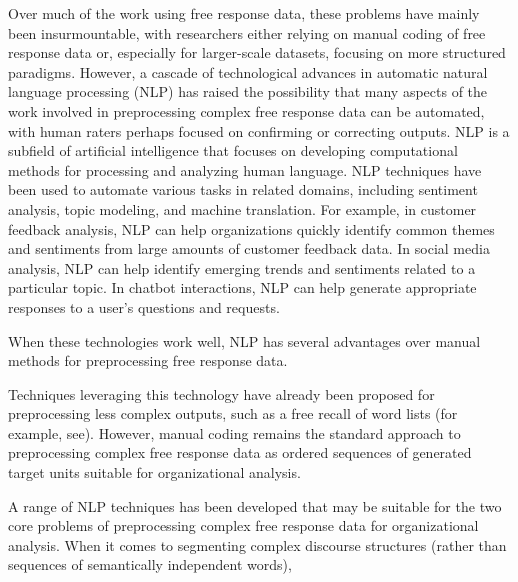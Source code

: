 \documentclass[
  letterpaper,
  DIV=11,
  numbers=noendperiod]{scrreprt}
\begin{document}
Over much of the work using free response data, these problems have
mainly been insurmountable, with researchers either relying on manual
coding of free response data or, especially for larger-scale datasets,
focusing on more structured paradigms. However, a cascade of
technological advances in automatic natural language processing (NLP)
has raised the possibility that many aspects of the work involved in
preprocessing complex free response data can be automated, with human
raters perhaps focused on confirming or correcting outputs. NLP is a
subfield of artificial intelligence that focuses on developing
computational methods for processing and analyzing human language. NLP
techniques have been used to automate various tasks in related domains,
including sentiment analysis, topic modeling, and machine translation.
For example, in customer feedback analysis, NLP can help organizations
quickly identify common themes and sentiments from large amounts of
customer feedback data. In social media analysis, NLP can help identify
emerging trends and sentiments related to a particular topic. In chatbot
interactions, NLP can help generate appropriate responses to a user's
questions and requests.

When these technologies work well, NLP has several advantages over
manual methods for preprocessing free response data.

Techniques leveraging this technology have already been proposed for
preprocessing less complex outputs, such as a free recall of word lists
(for example, see). However, manual coding remains the standard approach
to preprocessing complex free response data as ordered sequences of
generated target units suitable for organizational analysis.

A range of NLP techniques has been developed that may be suitable for
the two core problems of preprocessing complex free response data for
organizational analysis. When it comes to segmenting complex discourse
structures (rather than sequences of semantically independent words),

\begin{tcolorbox}[enhanced jigsaw, leftrule=.75mm, arc=.35mm, breakable, coltitle=black, toprule=.15mm, colback=white, left=2mm, colbacktitle=quarto-callout-caution-color!10!white, opacityback=0, colframe=quarto-callout-caution-color-frame, bottomtitle=1mm, titlerule=0mm, toptitle=1mm, bottomrule=.15mm, rightrule=.15mm, title=\textcolor{quarto-callout-caution-color}{\faFire}\hspace{0.5em}{TODO: Above needs a review of significant examples of work attempting to
automate the coding of both straightforward and more complex
free-response data and outline the domains in NLP applicable to this
task}, opacitybacktitle=0.6]

\end{tcolorbox}
\end{document}
